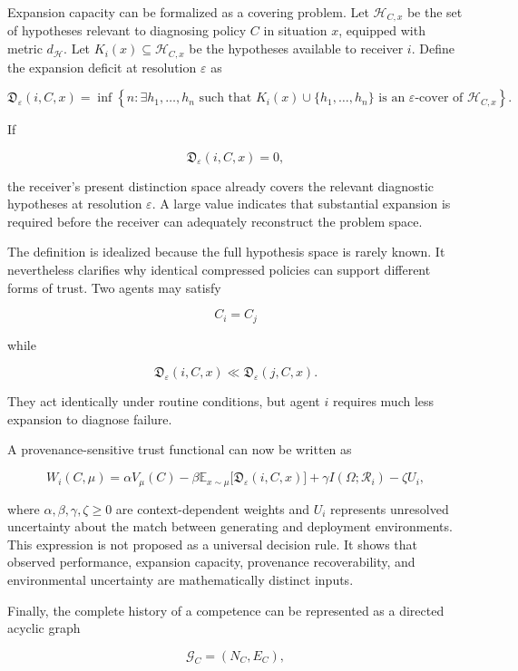 \documentclass[11pt]{article}
\begin{document}
Expansion capacity can be formalized as a covering problem. Let $\mathcal{H}_{C,x}$ be the set of hypotheses relevant to diagnosing policy $C$ in situation $x$, equipped with metric $d_{\mathcal{H}}$. Let $K_i(x)\subseteq\mathcal{H}_{C,x}$ be the hypotheses available to receiver $i$. Define the expansion deficit at resolution $\varepsilon$ as

\[
\mathfrak{D}_{\varepsilon}(i,C,x)
=
\inf
\left\{
n :
\exists h_1,\ldots,h_n
\text{ such that }
K_i(x)\cup\{h_1,\ldots,h_n\}
\text{ is an }\varepsilon\text{-cover of }
\mathcal{H}_{C,x}
\right\}.
\]

If

\[
\mathfrak{D}_{\varepsilon}(i,C,x)=0,
\]

the receiver's present distinction space already covers the relevant diagnostic hypotheses at resolution $\varepsilon$. A large value indicates that substantial expansion is required before the receiver can adequately reconstruct the problem space.

The definition is idealized because the full hypothesis space is rarely known. It nevertheless clarifies why identical compressed policies can support different forms of trust. Two agents may satisfy

\[
C_i=C_j
\]

while

\[
\mathfrak{D}_{\varepsilon}(i,C,x)
\ll
\mathfrak{D}_{\varepsilon}(j,C,x).
\]

They act identically under routine conditions, but agent $i$ requires much less expansion to diagnose failure.

A provenance-sensitive trust functional can now be written as

\[
W_i(C,\mu)
=
\alpha V_{\mu}(C)
-
\beta \mathbb{E}_{x\sim\mu}
\bigl[
\mathfrak{D}_{\varepsilon}(i,C,x)
\bigr]
+
\gamma I(\Omega;\mathcal{R}_i)
-
\zeta U_i,
\]

where $\alpha,\beta,\gamma,\zeta\geq 0$ are context-dependent weights and $U_i$ represents unresolved uncertainty about the match between generating and deployment environments. This expression is not proposed as a universal decision rule. It shows that observed performance, expansion capacity, provenance recoverability, and environmental uncertainty are mathematically distinct inputs.

Finally, the complete history of a competence can be represented as a directed acyclic graph

\[
\mathcal{G}_C=(N_C,E_C),
\]
\end{document}

